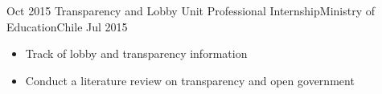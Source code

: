 \begin{experiences}
  \emptySeparator 
  \experience 
    {Oct 2015} {Transparency and Lobby Unit Professional Internship}{Ministry of Education}{Chile} {Jul 2015}
    {\begin{itemize}
    \item Track of lobby and transparency information
    \item Conduct a literature review on transparency and open government
    \end{itemize}}
    {}
\end{experiences}
\vspace{-2mm}